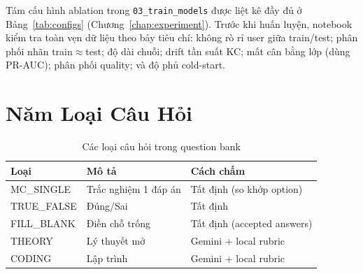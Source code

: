 \noindent Tám cấu hình ablation trong \texttt{03\_train\_models} được liệt kê đầy đủ ở Bảng~\ref{tab:configs} (Chương~\ref{chap:experiment}). Trước khi huấn luyện, notebook kiểm tra toàn vẹn dữ liệu theo bảy tiêu chí: không rò rỉ user giữa train/test; phân phối nhãn train$\approx$test; độ dài chuỗi; drift tần suất KC; mất cân bằng lớp (dùng PR-AUC); phân phối quality; và độ phủ cold-start.

\section{Năm Loại Câu Hỏi}
\label{apx:qtypes}

\begin{table}[H]
  \centering
  \caption{Các loại câu hỏi trong question bank}
  \begin{tabular}{lll}
    \toprule
    \textbf{Loại} & \textbf{Mô tả} & \textbf{Cách chấm} \\
    \midrule
    MC\_SINGLE  & Trắc nghiệm 1 đáp án & Tất định (so khớp option) \\
    TRUE\_FALSE & Đúng/Sai            & Tất định \\
    FILL\_BLANK & Điền chỗ trống      & Tất định (accepted answers) \\
    THEORY      & Lý thuyết mở        & Gemini + local rubric \\
    CODING      & Lập trình           & Gemini + local rubric \\
    \bottomrule
  \end{tabular}
\end{table}
